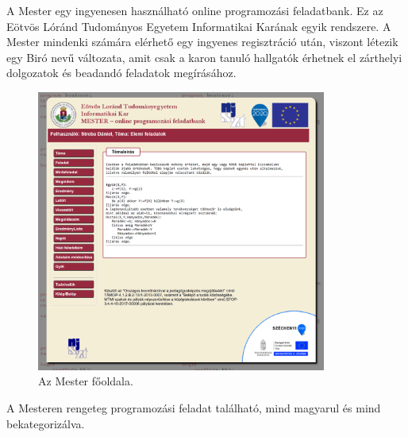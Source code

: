 A Mester egy ingyenesen használható online programozási feladatbank. Ez az Eötvös Lóránd Tudományos Egyetem Informatikai Karának egyik rendszere. \cite{elte-mester} A Mester mindenki számára elérhető egy ingyenes regisztráció után, viszont létezik egy Biró nevű változata, amit csak a karon tanuló hallgatók érhetnek el zárthelyi dolgozatok és beadandó feladatok megírásához. \cite{elte-biro}

\begin{figure}[h]
    \centering
    \includegraphics[width=0.85\textwidth]{images/mester.png}
    \caption{Az Mester főoldala.}
    \label{fig:mester}
\end{figure}

A Mesteren rengeteg programozási feladat található, mind magyarul és mind bekategorizálva.

